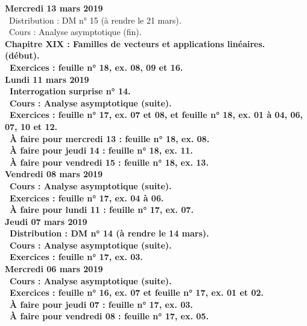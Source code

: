 \documentclass[12pt,a4paper]{article}
\begin{document}
\noindent\textbf{Mercredi 13 mars 2019} \\
\bu\ Distribution : DM n° 15 (à rendre le 21 mars).\\
\bu\ Cours : Analyse asymptotique (fin).\\
\bf Chapitre XIX \rm : Familles de vecteurs et applications linéaires.\\ 
(début).\\
\bu\ Exercices : feuille n° 18, ex. 08, 09 et 16.\vspace{.4cm}\\

\noindent\textbf{\bf Lundi 11 mars 2019} \\
\bu\ Interrogation surprise n° 14.\\
\bu\ Cours : Analyse asymptotique (suite).\\
\bu\ Exercices : feuille n° 17, ex. 07 et 08, et feuille n° 18, ex. 01 à 04, 06, 07, 10 et 12.\\
\bu\ À faire pour mercredi 13 : feuille n° 18, ex. 08.\\
\bu\ À faire pour jeudi 14 : feuille n° 18, ex. 11.\\
\bu\ À faire pour vendredi 15 : feuille n° 18, ex. 13.\vspace{.4cm}\\

\noindent\textbf{\bf Vendredi 08 mars 2019} \\
\bu\ Cours : Analyse asymptotique (suite).\\
\bu\ Exercices : feuille n° 17, ex. 04 à 06.\\
\bu\ À faire pour lundi 11 : feuille n° 17, ex. 07.\vspace{.4cm}\\

\noindent\textbf{Jeudi 07 mars 2019}\\
\bu\ Distribution : DM n° 14 (à rendre le 14 mars).\\
\bu\ Cours : Analyse asymptotique (suite).\\
\bu\ Exercices : feuille n° 17, ex. 03.\vspace{.4cm}\\

\noindent\textbf{Mercredi 06 mars 2019} \\
\bu\ Cours : Analyse asymptotique (suite).\\
\bu\ Exercices : feuille n° 16, ex. 07 et feuille n° 17, ex. 01 et 02.\\
\bu\ À faire pour jeudi 07 : feuille n° 17, ex. 03.\\
\bu\ À faire pour vendredi 08 : feuille n° 17, ex. 05.\vspace{.4cm}\\
\end{document}
